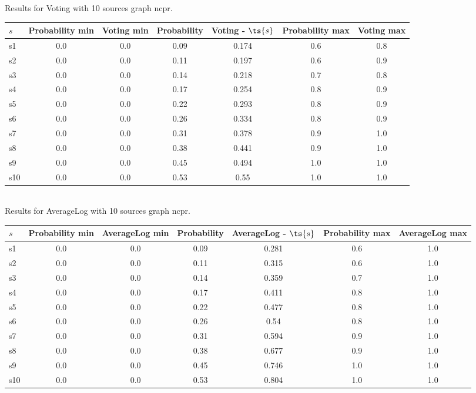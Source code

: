 \documentclass{article}
\begin{document}
\noindent Results for Voting with 10 sources graph ncpr.

\noindent\begin{tabular}{|l|c|c|c|c|c|c|}
\hline
$s$& Probability min & Voting min & Probability & Voting - $\ts{s}$ & Probability max & Voting max\\
\hline
s1 &0.0 & 0.0 & 0.09 & 0.174 & 0.6 & 0.8\\
\hline
s2 &0.0 & 0.0 & 0.11 & 0.197 & 0.6 & 0.9\\
\hline
s3 &0.0 & 0.0 & 0.14 & 0.218 & 0.7 & 0.8\\
\hline
s4 &0.0 & 0.0 & 0.17 & 0.254 & 0.8 & 0.9\\
\hline
s5 &0.0 & 0.0 & 0.22 & 0.293 & 0.8 & 0.9\\
\hline
s6 &0.0 & 0.0 & 0.26 & 0.334 & 0.8 & 0.9\\
\hline
s7 &0.0 & 0.0 & 0.31 & 0.378 & 0.9 & 1.0\\
\hline
s8 &0.0 & 0.0 & 0.38 & 0.441 & 0.9 & 1.0\\
\hline
s9 &0.0 & 0.0 & 0.45 & 0.494 & 1.0 & 1.0\\
\hline
s10 &0.0 & 0.0 & 0.53 & 0.55 & 1.0 & 1.0\\
\hline
\end{tabular}\\

\noindent Results for AverageLog with 10 sources graph ncpr.

\noindent\begin{tabular}{|l|c|c|c|c|c|c|}
\hline
$s$& Probability min & AverageLog min & Probability & AverageLog - $\ts{s}$ & Probability max & AverageLog max\\
\hline
s1 &0.0 & 0.0 & 0.09 & 0.281 & 0.6 & 1.0\\
\hline
s2 &0.0 & 0.0 & 0.11 & 0.315 & 0.6 & 1.0\\
\hline
s3 &0.0 & 0.0 & 0.14 & 0.359 & 0.7 & 1.0\\
\hline
s4 &0.0 & 0.0 & 0.17 & 0.411 & 0.8 & 1.0\\
\hline
s5 &0.0 & 0.0 & 0.22 & 0.477 & 0.8 & 1.0\\
\hline
s6 &0.0 & 0.0 & 0.26 & 0.54 & 0.8 & 1.0\\
\hline
s7 &0.0 & 0.0 & 0.31 & 0.594 & 0.9 & 1.0\\
\hline
s8 &0.0 & 0.0 & 0.38 & 0.677 & 0.9 & 1.0\\
\hline
s9 &0.0 & 0.0 & 0.45 & 0.746 & 1.0 & 1.0\\
\hline
s10 &0.0 & 0.0 & 0.53 & 0.804 & 1.0 & 1.0\\
\hline
\end{tabular}\\
\end{document}
